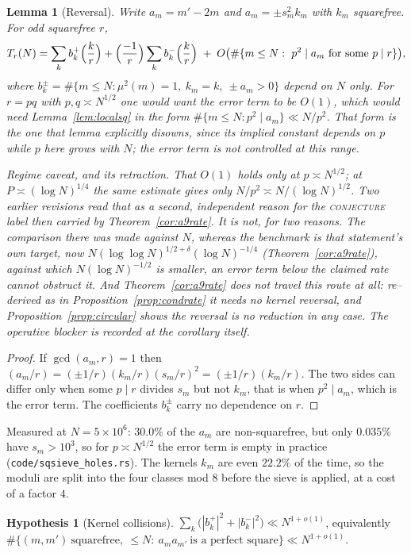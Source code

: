 \documentclass[11pt]{article}
\newtheorem{lemma}[theorem]{Lemma}
\theoremstyle{definition}
\newtheorem{hypothesis}[theorem]{Hypothesis}
\begin{document}
\begin{lemma}[Reversal]\label{lem:reversal}
Write $a_m=m'-2m$ and $a_m=\pm s_m^2k_m$ with $k_m$ squarefree. For odd squarefree $r$,
\[ T_r(N)=\sum_{k}b_k^{+}\Bigl(\frac kr\Bigr)+\Bigl(\frac{-1}r\Bigr)\sum_{k}b_k^{-}\Bigl(\frac kr\Bigr)
   \;+\;O\bigl(\#\{m\le N:\ p^2\mid a_m\ \text{for some }p\mid r\}\bigr), \]
where $b^{\pm}_k=\#\{m\le N:\mu^2(m)=1,\ k_m=k,\ \pm a_m>0\}$ depend on $N$ only. For
$r=pq$ with $p,q\asymp N^{1/2}$ one would want the error term to be $O(1)$, which would need Lemma~\textup{\ref{lem:localsq}} in the form $\#\{m\le N:p^2\mid a_m\}\ll N/p^2$. That form is
the one that lemma explicitly disowns, since its implied constant depends on $p$ while $p$ here grows
with $N$; the error term is not controlled at this range.

\emph{Regime caveat, and its retraction.} That $O(1)$ holds only at $p\asymp N^{1/2}$; at
$P\asymp(\log N)^{1/4}$ the same estimate gives only $N/p^2\asymp N/(\log N)^{1/2}$. Two earlier
revisions read that as a second, independent reason for the \textsc{conjecture} label then carried by
Theorem~\ref{cor:a9rate}. It is not, for two reasons. The comparison there was made against $N$,
whereas the benchmark is that statement's own target, now
$N(\log\log N)^{1/2+\delta}(\log N)^{-1/4}$ \textup{(}Theorem~\ref{cor:a9rate}\textup{)}, against which
$N(\log N)^{-1/2}$ is \emph{smaller}, an error term below the claimed rate cannot obstruct it.
And Theorem~\ref{cor:a9rate} does not travel this route at all: re--derived as in
Proposition~\ref{prop:condrate} it needs no kernel reversal, and Proposition~\ref{prop:circular}
shows the reversal is no reduction in any case. The operative blocker is recorded at the corollary
itself.
\end{lemma}
\begin{proof}
If $\gcd(a_m,r)=1$ then $(a_m/r)=(\pm1/r)(k_m/r)(s_m/r)^2=(\pm1/r)(k_m/r)$. The two sides can differ
only when some $p\mid r$ divides $s_m$ but not $k_m$, that is when $p^2\mid a_m$, which is the error
term. The coefficients $b^{\pm}_k$ carry no dependence on $r$.
\end{proof}
Measured at $N=5\times10^6$: $30.0\%$ of the $a_m$ are non-squarefree, but only $0.035\%$ have
$s_m>10^3$, so for $p\asymp N^{1/2}$ the error term is empty in practice
\textup{(\texttt{code/sqsieve\_holes.rs})}. The kernels $k_m$ are even $22.2\%$ of the time, so
the moduli are split into the four classes mod $8$ before the sieve is applied, at a cost of a
factor $4$.

\begin{hypothesis}[Kernel collisions]\label{hyp:kernel}
$\sum_k\bigl(|b^{+}_k|^2+|b^{-}_k|^2\bigr)\ll N^{1+o(1)}$, equivalently
$\#\{(m,m')\ \text{squarefree},\ \le N:\ a_ma_{m'}\ \text{is a perfect square}\}\ll N^{1+o(1)}$.
\end{hypothesis}
\end{document}
